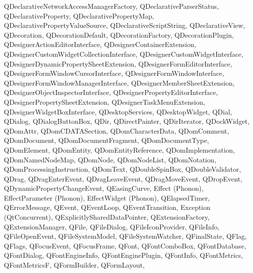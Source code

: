 {{        QDeclarativeNetworkAccessManagerFactory,
        QDeclarativeParserStatus,
        QDeclarativeProperty,
        QDeclarativePropertyMap,
        QDeclarativePropertyValueSource,
        QDeclarativeScriptString,
        QDeclarativeView,
        QDecoration,
        QDecorationDefault,
        QDecorationFactory,
        QDecorationPlugin,
        QDesignerActionEditorInterface,
        QDesignerContainerExtension,
        QDesignerCustomWidgetCollectionInterface,
        QDesignerCustomWidgetInterface,
        QDesignerDynamicPropertySheetExtension,
        QDesignerFormEditorInterface,
        QDesignerFormWindowCursorInterface,
        QDesignerFormWindowInterface,
        QDesignerFormWindowManagerInterface,
        QDesignerMemberSheetExtension,
        QDesignerObjectInspectorInterface,
        QDesignerPropertyEditorInterface,
        QDesignerPropertySheetExtension,
        QDesignerTaskMenuExtension,
        QDesignerWidgetBoxInterface,
        QDesktopServices,
        QDesktopWidget,
        QDial,
        QDialog,
        QDialogButtonBox,
        QDir,
        QDirectPainter,
        QDirIterator,
        QDockWidget,
        QDomAttr,
        QDomCDATASection,
        QDomCharacterData,
        QDomComment,
        QDomDocument,
        QDomDocumentFragment,
        QDomDocumentType,
        QDomElement,
        QDomEntity,
        QDomEntityReference,
        QDomImplementation,
        QDomNamedNodeMap,
        QDomNode,
        QDomNodeList,
        QDomNotation,
        QDomProcessingInstruction,
        QDomText,
        QDoubleSpinBox,
        QDoubleValidator,
        QDrag,
        QDragEnterEvent,
        QDragLeaveEvent,
        QDragMoveEvent,
        QDropEvent,
        QDynamicPropertyChangeEvent,
        QEasingCurve,
        Effect (Phonon),
        EffectParameter (Phonon),
        EffectWidget (Phonon),
        QElapsedTimer,
        QErrorMessage,
        QEvent,
        QEventLoop,
        QEventTransition,
        Exception (QtConcurrent),
        QExplicitlySharedDataPointer,
        QExtensionFactory,
        QExtensionManager,
        QFile,
        QFileDialog,
        QFileIconProvider,
        QFileInfo,
        QFileOpenEvent,
        QFileSystemModel,
        QFileSystemWatcher,
        QFinalState,
        QFlag,
        QFlags,
        QFocusEvent,
        QFocusFrame,
        QFont,
        QFontComboBox,
        QFontDatabase,
        QFontDialog,
        QFontEngineInfo,
        QFontEnginePlugin,
        QFontInfo,
        QFontMetrics,
        QFontMetricsF,
        QFormBuilder,
        QFormLayout,
}}
